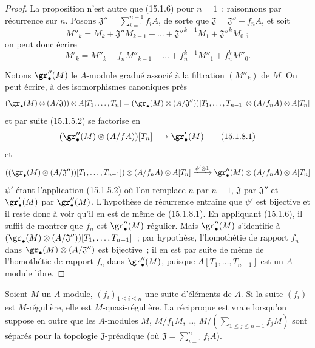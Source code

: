 \begin{proof}
La proposition n'est autre que (15.1.6) pour $n=1$~; raisonnons par récurrence
sur $n$. Posons
$\mathfrak{J}''=\sum_{i=1}^{n-1}f_iA$,
de sorte que $\mathfrak{J}=\mathfrak{J}''+f_nA$, et soit
\[
  M''_k=M_k+\mathfrak{J}''M_{k-1}+\ldots+
  \mathfrak{J}''^{k-1}M_1+\mathfrak{J}''^kM_0~;
\]
on peut donc écrire
\[
  M'_k=M''_k+f_nM''_{k-1}+\ldots+f_n^{k-1}M''_1+f_n^kM''_0.
\]

Notons $\gr''_\bullet(M)$ le $A$-module gradué associé à la filtration
$(M''_k)$ de $M$. On peut écrire, à des isomorphismes canoniques près
\[
  (\gr_\bullet(M)\otimes(A/\mathfrak{J}))\otimes A[T_1,\ldots,T_n]
  =
  (\gr_\bullet(M)\otimes(A/\mathfrak{J}''))[T_1,\ldots,T_{n-1}]
  \otimes(A/f_nA)\otimes A[T_n]
\]
et par suite (15.1.5.2) se factorise en
\[
  (\gr''_\bullet(M)\otimes(A/fA))[T_n]\longrightarrow\gr'_\bullet(M)
  \tag{15.1.8.1}\label{0.15.1.8.1-fr}
\]
et
\[
  ((\gr_\bullet(M)\otimes(A/\mathfrak{J}''))[T_1,\ldots,T_{n-1}])
  \otimes(A/f_nA)\otimes A[T_n]
  \xrightarrow{\psi'\otimes1}
  \gr''_\bullet(M)\otimes(A/f_nA)\otimes A[T_n]
\]
$\psi'$ étant l'application (15.1.5.2) où l'on remplace $n$ par $n-1$,
$\mathfrak{J}$ par $\mathfrak{J}''$ et $\gr'_\bullet(M)$ par
$\gr''_\bullet(M)$. L'hypothèse de récurrence entraîne que $\psi'$ est
bijective et il reste donc à voir qu'il en est de même de (15.1.8.1). En
appliquant (15.1.6), il suffit de montrer que $f_n$ est
$\gr''_\bullet(M)$-régulier. Mais $\gr''_\bullet(M)$ s'identifie à
$(\gr_\bullet(M)\otimes(A/\mathfrak{J}''))[T_1,\ldots,T_{n-1}]$~;
par hypothèse, l'homothétie de rapport $f_n$ dans
$\gr_\bullet(M)\otimes(A/\mathfrak{J}'')$ est bijective~; il en est par suite
de même de l'homothétie de rapport $f_n$ dans $\gr''_\bullet(M)$, puisque
$A[T_1,\ldots,T_{n-1}]$ est un $A$-module libre.
\end{proof}

\begin{proposition}[15.1.9]
\label{0.15.1.9-fr}
Soient $M$ un $A$-module, $(f_i)_{1\leq i\leq n}$ une suite d'éléments de $A$.
Si la suite $(f_i)$ est $M$-régulière, elle est $M$-quasi-régulière. La
réciproque est vraie lorsqu'on suppose en outre que les $A$-modules
$M$, $M/f_1M$, \ldots, $M/\left(\sum_{1\leq j\leq n-1}f_jM\right)$
sont séparés pour la topologie $\mathfrak{J}$-préadique (où
$\mathfrak{J}=\sum_{i=1}^n f_iA$).
\end{proposition}

